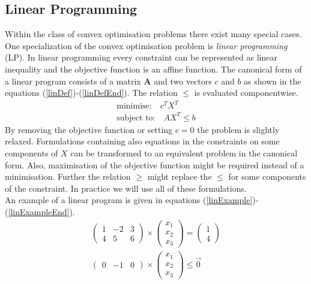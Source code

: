 \subsection{Linear Programming}
\label{sec:MathLinearProgram}
Within the class of convex optimisation problems there exist many special cases. One specialization of the convex optimisation problem is \emph{linear programming} (LP).
In linear programming every constraint can be represented as linear inequality and the objective function is an affine function. 
The canonical form of a linear program consists of a matrix $\mathbf{A}$ and two vectors ${c}$ and ${b}$ as shown in the equations (\ref{linDef})-(\ref{linDefEnd}). The relation $\leq$ is evaluated componentwise.
\begin{eqnarray}
\label{linDef}
\text{minimise:}\quad {c}^TX^T \\
\label{linDefEnd}
\text{subject to:}\quad AX^T\leq{b}
\end{eqnarray}
By removing the objective function or setting ${c} = {0} $ the problem is slightly relaxed. Formulations containing also equations in the constraints on some components of $X$ can be transformed to an equivalent problem in the canonical form. Also, maximisation of the objective function might be required instead of a minimisation. Further the relation $\geq$ might replace the $\leq$ for some components of the constraint. In practice we will use all of these formulations.\\
An example of a linear program is given in equations (\ref{linExample})-(\ref{linExampleEnd}).
\begin{eqnarray}
\label{linExample}
\begin{pmatrix}
1 & -2 & 3 \\
4 & 5 & 6 
\end{pmatrix}\times\begin{pmatrix}
x_1 \\ x_2 \\ x_3
\end{pmatrix} = \begin{pmatrix}
1 \\ 4
\end{pmatrix}\\
\begin{pmatrix}
0&-1&0
\end{pmatrix}\times\begin{pmatrix}
x_1 \\ x_2 \\ x_3
\label{linExampleEnd}
\end{pmatrix}\leq \vec{0}
\end{eqnarray}
